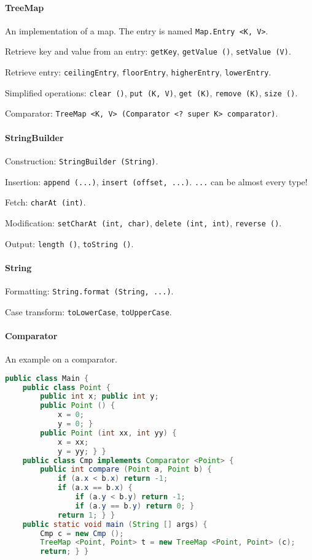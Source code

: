 \paragraph{TreeMap}
An implementation of a map. The entry is named \texttt{Map.Entry <K, V>}.

Retrieve key and value from an entry: \texttt{getKey}, \texttt{getValue ()}, \texttt{setValue (V)}.

Retrieve entry: \texttt{ceilingEntry}, \texttt{floorEntry}, \texttt{higherEntry}, \texttt{lowerEntry}.

Simplified operations: \texttt{clear ()}, \texttt{put (K, V)}, \texttt{get (K)}, \texttt{remove (K)}, \texttt{size ()}.

Comparator: \texttt{TreeMap <K, V> (Comparator <? super K> comparator)}.

\paragraph{StringBuilder}

Construction: \texttt{StringBuilder (String)}.

Insertion: \texttt{append (...)}, \texttt{insert (offset, ...)}. \texttt{...} can be almost every type!

Fetch: \texttt{charAt (int)}.

Modification: \texttt{setCharAt (int, char)}, \texttt{delete (int, int)}, \texttt{reverse ()}.

Output: \texttt{length ()}, \texttt{toString ()}.

\paragraph{String}
Formatting: \texttt{String.format (String, ...)}.

Case transform: \texttt{toLowerCase}, \texttt{toUpperCase}.

\paragraph{Comparator}
An example on a comparator.
\begin{lstlisting}[language=java]
public class Main {
	public class Point {
		public int x; public int y;
		public Point () {
			x = 0;
			y = 0; }
		public Point (int xx, int yy) {
			x = xx;
			y = yy; } }
	public class Cmp implements Comparator <Point> {
		public int compare (Point a, Point b) {
			if (a.x < b.x) return -1;
			if (a.x == b.x) {
				if (a.y < b.y) return -1;
				if (a.y == b.y) return 0; }
			return 1; } }
	public static void main (String [] args) {
		Cmp c = new Cmp ();
		TreeMap <Point, Point> t = new TreeMap <Point, Point> (c);
		return; } }
\end{lstlisting}

